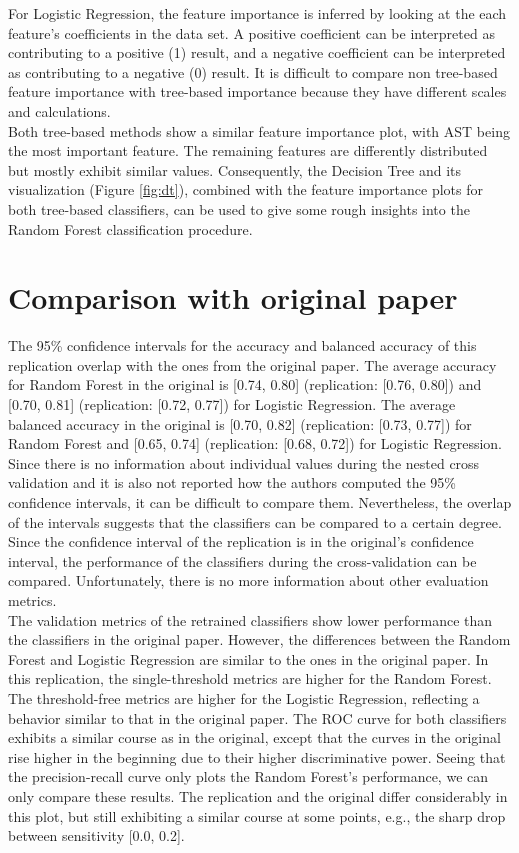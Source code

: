 For Logistic Regression, the feature importance is inferred by looking at the 
each feature's coefficients in the data set. A positive coefficient can be 
interpreted as contributing to a positive (1) result, and a negative 
coefficient can be interpreted as contributing to a negative (0) result.
It is difficult to compare non tree-based feature importance with tree-based 
importance because they have different scales and calculations.
\\
Both tree-based methods show a similar feature importance plot, with AST being 
the most important feature. The remaining features are differently distributed 
but mostly exhibit similar values. Consequently, the Decision Tree and its 
visualization (Figure \ref{fig:dt}), combined with the feature 
importance plots for both tree-based classifiers, can be used to give some 
rough insights into the Random Forest classification procedure.

\section{Comparison with original paper}
The 95\% confidence intervals for the accuracy and balanced accuracy of this 
replication overlap with the ones from the original paper. The average accuracy 
for Random Forest in the original is [0.74, 0.80] (replication: [0.76, 0.80]) 
and [0.70, 0.81] (replication: [0.72, 0.77]) for Logistic Regression. The 
average balanced accuracy in the original is [0.70, 0.82] (replication: 
[0.73, 0.77]) for Random Forest and [0.65, 0.74] (replication: [0.68, 0.72]) 
for Logistic Regression. Since there is no information about individual values 
during the nested cross validation and it is also not reported how the authors 
computed the 95\% confidence intervals, it can be difficult to compare them. 
Nevertheless, the overlap of the intervals suggests that the classifiers can be 
compared to a certain degree. Since the confidence interval of the replication 
is in the original's confidence interval, the performance of the 
classifiers during the cross-validation can be compared. Unfortunately, there 
is no more information about other evaluation metrics.
\\
The validation metrics of the retrained classifiers show lower performance 
than the classifiers in the original paper. However, the differences between 
the Random Forest and Logistic Regression are similar to the ones in the 
original paper. In this replication, the single-threshold metrics are higher 
for the 
Random Forest. The threshold-free metrics are higher for the Logistic 
Regression, reflecting a behavior similar to that in the original paper. The 
ROC curve for both classifiers exhibits a similar course as in the original, 
except that the curves in the original rise higher in the beginning due to 
their higher discriminative power. Seeing that the precision-recall curve only 
plots the Random Forest's performance, we can only compare these results. 
The replication and the original differ considerably in this plot, but still 
exhibiting a similar course at some points, e.g., the sharp drop between 
sensitivity [0.0, 0.2]. 
